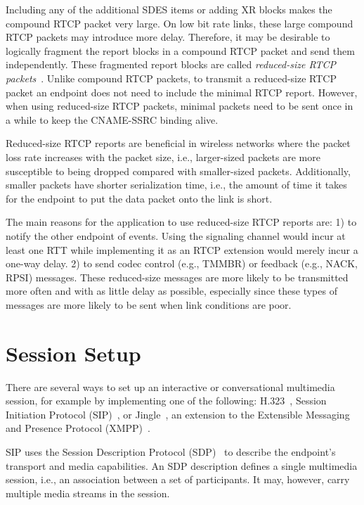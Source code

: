 Including any of the additional SDES items or adding XR blocks makes the
compound RTCP packet very large. On low bit rate links, these large compound
RTCP packets may introduce more delay. Therefore, it may be desirable to
logically fragment the report blocks in a compound RTCP packet and send them
independently. These fragmented report blocks are called \emph {reduced-size
RTCP packets}~\cite{rfc5506}. Unlike compound RTCP packets, to transmit a
reduced-size RTCP packet an endpoint does not need to include the minimal RTCP
report. However, when using reduced-size RTCP packets, minimal packets need to
be sent once in a while to keep the CNAME-SSRC binding alive.

Reduced-size RTCP reports are beneficial in wireless networks where the packet
loss rate increases with the packet size, i.e., larger-sized packets are more
susceptible to being dropped compared with smaller-sized packets. Additionally, smaller
packets have shorter serialization time, i.e., the amount of time it takes for
the endpoint to put the data packet onto the link is short.

The main reasons for the application to use reduced-size RTCP reports are:
1) to notify the other endpoint of events. Using the signaling channel would
incur at least one RTT while implementing it as an RTCP extension would merely
incur a one-way delay. 2) to send codec control (e.g., TMMBR) or feedback (e.g.,
NACK, RPSI) messages. These reduced-size messages are more likely to be
transmitted more often and with as little delay as possible, especially since
these types of messages are more likely to be sent when link conditions are
poor.


\section{Session Setup}


There are several ways to set up an interactive or conversational multimedia
session, for example by implementing one of the following: H.323~\cite{H.323},
Session Initiation Protocol (SIP)~\cite{rfc3261}, or Jingle~\cite{XEP-0166}, an
extension to the Extensible Messaging and Presence Protocol
(XMPP)~\cite{rfc6120}.

SIP uses the Session Description Protocol (SDP)~\cite{rfc4566} to describe the
endpoint's transport and media capabilities. An SDP description defines a
single multimedia session, i.e., an association between a set of participants.
It may, however, carry multiple media streams in the session.

